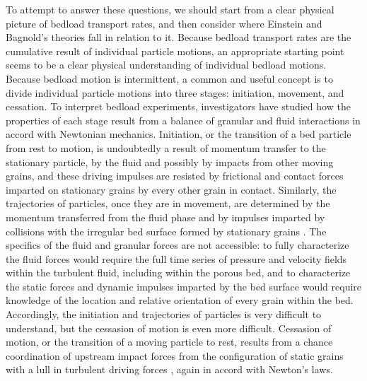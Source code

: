 \documentclass{article}
\begin{document}


To attempt to answer these questions, we should start from a clear physical picture of bedload transport rates, and then consider where Einstein and Bagnold's theories fall in relation to it. 
Because bedload transport rates are the cumulative result of individual particle motions, an appropriate starting point seems to be a clear physical understanding of individual bedload motions. 
Because bedload motion is intermittent, a common and useful concept is to divide individual particle motions into three stages: initiation, movement, and cessation. 
To interpret bedload experiments, investigators have studied how the properties of each stage result from a balance of granular and fluid interactions in accord with Newtonian mechanics. 
Initiation, or the transition of a bed particle from rest to motion, is undoubtedly a result of momentum transfer to the stationary particle, by the fluid and possibly by impacts from other moving grains, and these driving impulses are resisted by frictional and contact forces imparted on stationary grains by every other grain in contact. 
Similarly, the trajectories of particles, once they are in movement, are determined by the momentum transferred from the fluid phase and by impulses imparted by collisions with the irregular bed surface formed by stationary grains \citep{Wiberg1985, Bialik2015}. 
The specifics of the fluid and granular forces are not accessible: to fully characterize the fluid forces would require the full time series of pressure and velocity fields within the turbulent fluid, including within the porous bed, and to characterize the static forces and dynamic impulses imparted by the bed surface would require knowledge of the location and relative orientation of every grain within the bed. 
Accordingly, the initiation and trajectories of particles is very difficult to understand, but the cessasion of motion is even more difficult. 
Cessasion of motion, or the transition of a moving particle to rest, results from a chance coordination of upstream impact forces from the configuration of static grains with a lull in turbulent driving forces \citep{Pahtz2018}, again in accord with Newton's laws.  





\end{document}
